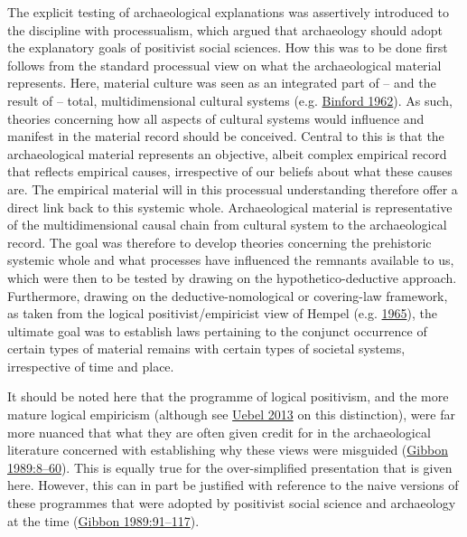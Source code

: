 \documentclass[
  12pt,
  a4paper,
  oneside]{book}
\begin{document}
The explicit testing of archaeological explanations was assertively introduced to the discipline with processualism, which argued that archaeology should adopt the explanatory goals of positivist social sciences. How this was to be done first follows from the standard processual view on what the archaeological material represents. Here, material culture was seen as an integrated part of -- and the result of -- total, multidimensional cultural systems (e.g. \protect\hyperlink{ref-binford1962}{Binford 1962}). As such, theories concerning how all aspects of cultural systems would influence and manifest in the material record should be conceived. Central to this is that the archaeological material represents an objective, albeit complex empirical record that reflects empirical causes, irrespective of our beliefs about what these causes are. The empirical material will in this processual understanding therefore offer a direct link back to this systemic whole. Archaeological material is representative of the multidimensional causal chain from cultural system to the archaeological record. The goal was therefore to develop theories concerning the prehistoric systemic whole and what processes have influenced the remnants available to us, which were then to be tested by drawing on the hypothetico-deductive approach. Furthermore, drawing on the deductive-nomological or covering-law framework, as taken from the logical positivist/empiricist view of Hempel (e.g. \protect\hyperlink{ref-hempel1965}{1965}), the ultimate goal was to establish laws pertaining to the conjunct occurrence of certain types of material remains with certain types of societal systems, irrespective of time and place.

It should be noted here that the programme of logical positivism, and the more mature logical empiricism (although see \protect\hyperlink{ref-uebel2013}{Uebel 2013} on this distinction), were far more nuanced that what they are often given credit for in the archaeological literature concerned with establishing why these views were misguided (\protect\hyperlink{ref-gibbon1989}{Gibbon 1989:8--60}). This is equally true for the over-simplified presentation that is given here. However, this can in part be justified with reference to the naive versions of these programmes that were adopted by positivist social science and archaeology at the time (\protect\hyperlink{ref-gibbon1989}{Gibbon 1989:91--117}).
\end{document}
